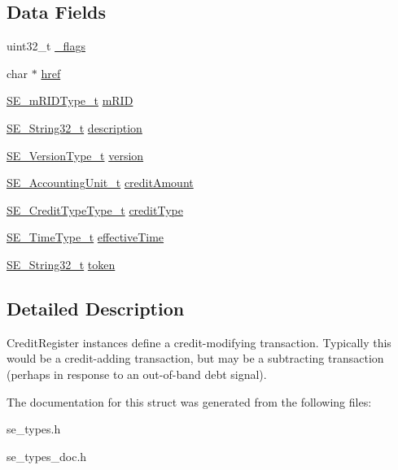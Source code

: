 \subsection*{Data Fields}
\begin{DoxyCompactItemize}
\item 
uint32\+\_\+t \hyperlink{group__CreditRegister_gadbc5a3366401cd1972b2e99c05b685f0}{\+\_\+flags}
\item 
char $\ast$ \hyperlink{group__CreditRegister_ga6dc29bbd10dc51848e6fbedbfbdbc428}{href}
\item 
\hyperlink{group__mRIDType_gac74622112f3a388a2851b2289963ba5e}{S\+E\+\_\+m\+R\+I\+D\+Type\+\_\+t} \hyperlink{group__CreditRegister_ga08dc81d2c42276324c84c732071a907a}{m\+R\+ID}
\item 
\hyperlink{group__String32_gac9f59b06b168b4d2e0d45ed41699af42}{S\+E\+\_\+\+String32\+\_\+t} \hyperlink{group__CreditRegister_gaa27bbe878f77be7bdaa8a8a74d845f0c}{description}
\item 
\hyperlink{group__VersionType_ga4b8d27838226948397ed99f67d46e2ae}{S\+E\+\_\+\+Version\+Type\+\_\+t} \hyperlink{group__CreditRegister_gae291a84e122c89e218a4a85dc5be4cb7}{version}
\item 
\hyperlink{structSE__AccountingUnit__t}{S\+E\+\_\+\+Accounting\+Unit\+\_\+t} \hyperlink{group__CreditRegister_ga1ddd68658ee4d433120cf122868ada78}{credit\+Amount}
\item 
\hyperlink{group__CreditTypeType_ga5a63742e5c65087df17ed6ad8f420b5e}{S\+E\+\_\+\+Credit\+Type\+Type\+\_\+t} \hyperlink{group__CreditRegister_ga64f4538c159f8e56b25fad6e98265b86}{credit\+Type}
\item 
\hyperlink{group__TimeType_ga6fba87a5b57829b4ff3f0e7638156682}{S\+E\+\_\+\+Time\+Type\+\_\+t} \hyperlink{group__CreditRegister_gabed95bad275808f5aefbf623bc20aaec}{effective\+Time}
\item 
\hyperlink{group__String32_gac9f59b06b168b4d2e0d45ed41699af42}{S\+E\+\_\+\+String32\+\_\+t} \hyperlink{group__CreditRegister_ga360e14671fe75ee6b62e1034f2045ee9}{token}
\end{DoxyCompactItemize}


\subsection{Detailed Description}
Credit\+Register instances define a credit-\/modifying transaction. Typically this would be a credit-\/adding transaction, but may be a subtracting transaction (perhaps in response to an out-\/of-\/band debt signal). 

The documentation for this struct was generated from the following files\+:\begin{DoxyCompactItemize}
\item 
se\+\_\+types.\+h\item 
se\+\_\+types\+\_\+doc.\+h\end{DoxyCompactItemize}
